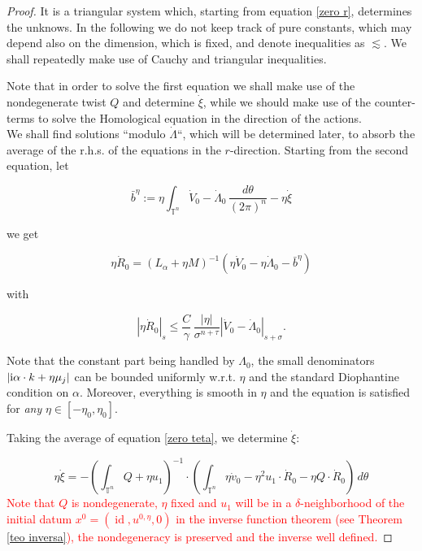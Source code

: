 \documentclass[oneside, 11pt]{amsbook}
\newcommand{\pa}[1]{{\left(#1\right)}}
\newcommand{\abs}[1]{{\left|#1\right|}}
\newcommand{\T}{\mathbb{T}}
\newcommand{\teta}{\theta}
\newcommand{\id}{\operatorname{id}}
\newcommand{\0}{{(0)}}
\newcommand{\3}{{(3)}}
\newcommand{\im}{{\rm i}}
\newcommand{\red}[1]{\textcolor{red}{#1}}
\numberwithin{equation}{section}
\numberwithin{defn}{section}
\numberwithin{prop}{section}
\numberwithin{cor}{section}
\numberwithin{lemma}{section}
\numberwithin{rmk}{section}
\numberwithin{corollary}{section}
\begin{document}
\begin{proof}
It is a triangular system which, starting from equation \eqref{zero r}, determines the unknows. In the following we do not keep track of pure constants, which may depend also on the dimension, which is fixed, and denote inequalities as $\lesssim$. We shall repeatedly make use of Cauchy and triangular inequalities.

 Note that in order to solve the first equation we shall make use of the nondegenerate twist $Q$ and determine $\dot\xi$, while we should make use of the counter-terms to solve the Homological equation in the direction of the actions.\\
 We shall find solutions ``modulo $\dot\Lambda$``, which will be determined later, to absorb the average of the r.h.s. of the equations in the $r$-direction. Starting from the second equation, let 
 
 $$
 \bar b^\eta := \eta \int_{\T^n} \dot V_0 - \dot\Lambda_0\,\frac{d\teta}{(2\pi)^n} -\eta\dot\xi
 $$
 
 we get 

\begin{equation}
\eta\dot R_{0} = (L_{\alpha} + \eta M)^{{-1}} ({\eta}\dot{V}_0  -\eta \dot{\Lambda}_0 - \bar b^\eta )
\end{equation}

with

\[\abs{\eta \dot{R}_0}_{s} \leq \frac{C}{\gamma}\,\frac{|\eta|}{\sigma^{n+\tau}}\abs{\dot{V}_0 - \dot\Lambda_0 }_{s+\sigma}. \]

Note that the constant part being handled by $\Lambda_{0}$, the small denominators $|\im\alpha\cdot k + \eta\mu_{j}|$ can be bounded uniformly w.r.t. $\eta$ and the standard Diophantine condition on $\alpha$. Moreover, everything is smooth in $\eta$ and the equation is satisfied for \emph{any} $\eta \in [-\eta_{0},\eta_{0}]$.

\medskip

Taking the average of equation \eqref{zero teta}, we determine $\dot\xi$:

\begin{equation}
\eta\dot\xi = - \pa{\int_{\T^{n}} Q + \eta u_{1}} ^{-1}\cdot\pa{  \int_{\T^{n}} \eta \dot v_{0} - \eta^{2} u_{1}\cdot \dot R_{0} - \eta Q\cdot\dot R_{0}} \, d\teta
\end{equation}
\red{Note that $Q$ is nondegenerate, $\eta$ fixed and $u_{1}$ will be in a $\delta$-neighborhood of the initial datum $x^0 = (\id, u^{0,\eta},0)$ in the inverse function theorem (see Theorem \ref{teo inversa}), the nondegeneracy is preserved and the inverse well defined.}


\end{proof}
\end{document}
